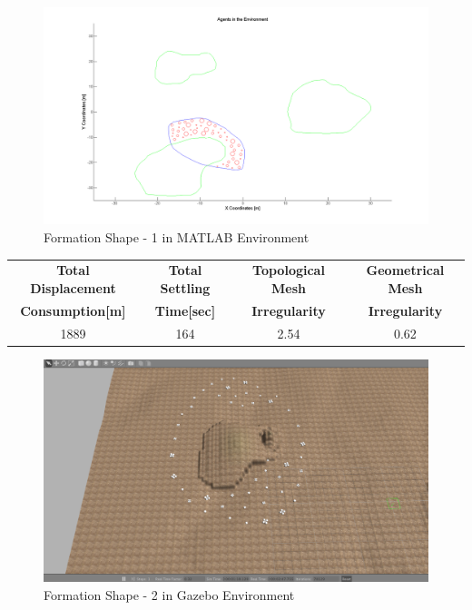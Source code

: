 \begin{figure}[H]
\caption{Formation Shape - 1 in MATLAB Environment}
\centerline{\includegraphics[scale = 0.40]{1}}
\end{figure} 
			
\begin{center}
 \label{tab:title} 
\begin{tabular}{||c| c |c |c ||}
					
\hline
\textbf{Total Displacement }  & \textbf{Total Settling} & \textbf{Topological Mesh} & \textbf{Geometrical Mesh} \\ \textbf{Consumption[m]} & \textbf{Time[sec]}& \textbf{Irregularity} & \textbf{Irregularity} \\
\hline
1889 & 164 &  2.54& 0.62\\
\hline
\end{tabular}
\end{center}
	
\begin{figure}[H]
\caption{Formation Shape - 2 in Gazebo Environment}
\centerline{\includegraphics[scale = 0.35]{2_Gazebo}}
\end{figure} 
		 
